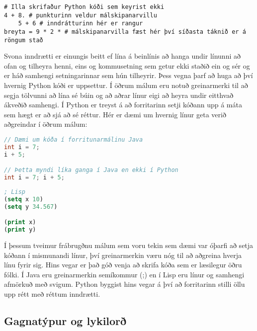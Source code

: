 \begin{lstlisting}[caption=Rangur Python kóði sem veldur villu, label=lst:inng-malskipanarvilla]
# Illa skrifaður Python kóði sem keyrist ekki
4 + 8. # punkturinn veldur málskipanarvillu
	5 + 6 # inndrátturinn hér er rangur
breyta = 9 * 2 * # málskipanarvilla fæst hér því síðasta táknið er á röngum stað
\end{lstlisting}

Svona inndrætti er einungis beitt ef lína á beinlínis að hanga undir línunni að ofan og tilheyra henni, eins og kommusetning sem getur ekki staðið ein og sér og er háð samhengi setningarinnar sem hún tilheyrir.
Þess vegna þarf að huga að því hvernig Python kóði er uppsettur. 
Í öðrum málum eru notuð greinarmerki til að segja tölvunni að lína sé búin og að aðrar línur eigi að heyra undir eitthvað ákveðið samhengi.
Í Python er treyst á að forritarinn setji kóðann upp á máta sem hægt er að sjá að sé réttur. 
Hér er dæmi um hvernig línur geta verið aðgreindar í öðrum málum:

\begin{lstlisting}[language=Java , caption=Dæmi um annað mál sem er strangt tagað og með greinarmerkjum]
// Dæmi um kóða í forritunarmálinu Java
int i = 7;
i + 5;

// Þetta myndi líka ganga í Java en ekki í Python
int i = 7; i + 5;
\end{lstlisting}

\begin{lstlisting}[language=Lisp, caption=Dæmi um annað mál sem byggir á afmörkuðu samhengi og er með greinarmerkjum]
; Lisp
(setq x 10)
(setq y 34.567)

(print x)
(print y)
\end{lstlisting}

Í þessum tveimur frábrugðnu málum sem voru tekin sem dæmi var óþarfi að setja kóðann í mismunandi línur, því greinarmerkin væru nóg til að aðgreina hverja línu fyrir sig. 
Hins vegar er það góð venja að skrifa kóða sem er læsilegur öðru fólki. Í Java eru greinarmerkin semíkommur (;) en í Lisp eru línur og samhengi afmörkuð með svigum. 
Python byggist hins vegar á því að forritarinn stilli öllu upp rétt með réttum inndrætti. 

\subsection{Gagnatýpur og lykilorð}

